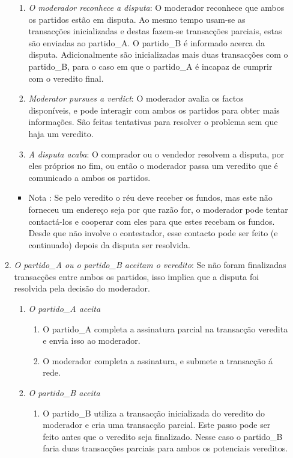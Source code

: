 \begin{enumerate}
\begin{enumerate}
\begin{enumerate}
            \item {\em O moderador reconhece a disputa}: O moderador reconhece que ambos os partidos estão em disputa. Ao mesmo tempo usam-se as transacções inicializadas e destas fazem-se transacções parciais, estas são enviadas ao partido\_A. O partido\_B é informado acerca da disputa. Adicionalmente são inicializadas mais duas transacções com o partido\_B, para o caso em que o partido\_A é incapaz de cumprir com o veredito final.    
            \item {\em Moderator pursues a verdict}: O moderador avalia os factos disponíveis, e pode interagir com ambos os partidos para obter mais informações. São feitas tentativas para resolver o problema sem que haja um veredito.  
            \item {\em A disputa acaba}: O comprador ou o vendedor resolvem a disputa, por eles próprios no fim, ou então o moderador passa um veredito que é comunicado a ambos os partidos.
        \end{enumerate}{}
        \begin{itemize}
            \item Nota : Se pelo veredito o réu deve receber os fundos, mas este não forneceu um endereço seja por que razão for, o moderador pode tentar contactá-los e cooperar com eles para que estes recebam os fundos. Desde que não involve o contestador, esse contacto pode ser feito (e continuado) depois da disputa ser resolvida.     
        \end{itemize}{}
        \item {\em O partido\_A ou o partido\_B aceitam o veredito}: Se não foram finalizadas transacções entre ambos os partidos, isso implica que a disputa foi resolvida pela decisão do moderador. 
        \begin{enumerate}
            \item {\em O partido\_A aceita}
            \begin{enumerate}
                \item O partido\_A completa a assinatura parcial na transacção veredita e envia isso ao moderador.  
                \item O moderador completa a assinatura, e submete a transacção á rede.
            \end{enumerate}{}
            \item {\em O partido\_B aceita}
            \begin{enumerate}
                \item O partido\_B utiliza a transacção inicializada do veredito do moderador e cria uma transacção parcial. Este passo pode ser feito antes que o veredito seja finalizado. Nesse caso o partido\_B faria duas transacções parciais para ambos os potenciais vereditos.    

\end{enumerate}
\end{enumerate}
\end{enumerate}
\end{enumerate}

